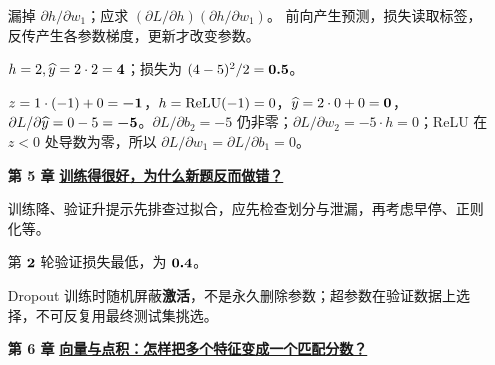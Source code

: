 \begin{enumerate}[leftmargin=5.4em,labelsep=.7em,itemsep=9pt]
\par{}漏掉 $\partial h/\partial w_1$；应求 $(\partial L/\partial h)(\partial h/\partial w_1)$。
前向产生预测，损失读取标签，反传产生各参数梯度，更新才改变参数。
\par{}$h=2,\widehat{y}=2\cdot2=\answerresult{4}$；损失为 $(4-5)^2/2=\answerresult{0.5}$。
\par{}$z=1\cdot(-1)+0=\answerresult{-1}$，$h=\relu(-1)=0$，$\widehat{y}=2\cdot0+0=\answerresult{0}$，$\partial L/\partial\widehat{y}=0-5=\answerresult{-5}$。$\partial L/\partial b_2=-5$ 仍非零；$\partial L/\partial w_2=-5\cdot h=0$；ReLU 在 $z<0$ 处导数为零，所以 $\partial L/\partial w_1=\partial L/\partial b_1=0$。
\par{}
\item[\textbf{第 5 章}] \label{answer:generalization}\textbf{\hyperref[check:generalization]{训练得很好，为什么新题反而做错？}}\par\nobreak
{}
训练降、验证升提示先排查过拟合，应先检查划分与泄漏，再考虑早停、正则化等。
\par{}第 $\boldsymbol{2}$ 轮验证损失最低，为 $\boldsymbol{0.4}$。
\par{}Dropout 训练时随机屏蔽\textbf{激活}，不是永久删除参数；超参数在验证数据上选择，不可反复用最终测试集挑选。
\par{}
\item[\textbf{第 6 章}] \label{answer:vectors}\textbf{\hyperref[check:vectors]{向量与点积：怎样把多个特征变成一个匹配分数？}}\par\nobreak
{}
\end{enumerate}
